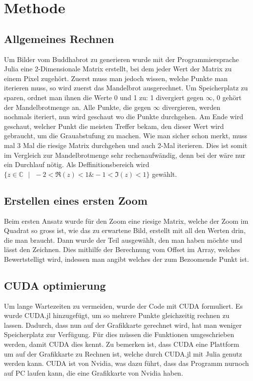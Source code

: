 \section{Methode}
\subsection{Allgemeines Rechnen}
Um Bilder vom Buddhabrot zu generieren wurde mit der Programmiersprache Julia eine 2-Dimensionale Matrix erstellt, bei dem jeder Wert der Matrix zu einem Pixel zugehört. Zuerst muss man jedoch wissen, welche Punkte man iterieren muss, so wird zuerst das Mandelbrot ausgerechnet. Um Speicherplatz zu sparen, ordnet man ihnen die Werte 0 und 1 zu: 1 divergiert gegen $\infty$, 0 gehört der Mandelbrotmenge an. Alle Punkte, die gegen $\infty$ divergieren, werden nochmals iteriert, nun wird geschaut wo die Punkte durchgehen. Am Ende wird geschaut, welcher Punkt die meisten Treffer bekam, den dieser Wert wird gebraucht, um die Grauabstufung zu machen. Wie man sicher schon merkt, muss mal 3 Mal die riesige Matrix durchgehen und auch 2-Mal iterieren. Dies ist somit im Vergleich zur Mandelbrotmenge sehr rechenaufwändig, denn bei der wäre nur ein Durchlauf nötig. Als Deffinitionsbereich wird $\{z \in \mathbb{C}\text{ }|\text{ }-2 < \Re(z) < 1 \& -1 < \Im(z) < 1\}$ gewählt.
\subsection{Erstellen eines ersten Zoom}
Beim ersten Ansatz wurde für den Zoom eine riesige Matrix, welche der Zoom im Quadrat so gross ist, wie das zu erwartene Bild, erstellt mit all den Werten drin, die man braucht. Dann wurde der Teil ausgewählt, den man haben möchte und lässt den Zeichnen. Dies mithilfe der Berechnung vom Offset im Array, welches Bewertstelligt wird, indessen man angibt welches der zum Bezoomende Punkt ist.
\subsection{CUDA optimierung}
Um lange Wartezeiten zu vermeiden, wurde der Code mit CUDA formuliert. Es wurde CUDA.jl hinzugefügt, um so mehrere Punkte gleichzeitig rechnen zu lassen. Dadurch, dass nun auf der Grafikkarte gerechnet wird, hat man weniger Speicherplatz zur Verfügung. Für dies müssen die Funktionen umgeschrieben werden, damit CUDA dies kennt. Zu bemerken ist, dass CUDA eine Plattform um auf der Grafikkarte zu Rechnen ist, welche durch CUDA.jl mit Julia genutz werden kann. CUDA ist von Nvidia, was dazu führt, dass das Programm nurnoch auf PC laufen kann, die eine Grafikkarte von Nvidia haben.
